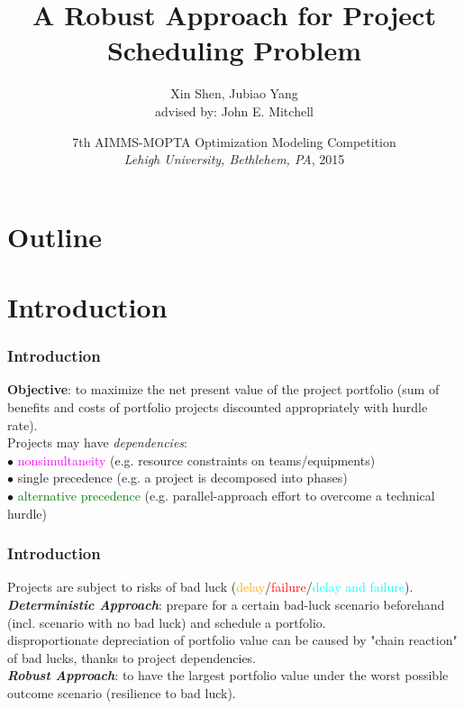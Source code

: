 \documentclass{beamer}
\title[Robust Scheduling]{A Robust Approach for Project Scheduling Problem}
\author[Shen, Yang]{Xin Shen, Jubiao Yang\\{\small advised by: John E. Mitchell}}
\institute[RPI]{ 
Rensselaer Polytechnic Institute  \\
Troy,  NY  12180}
\date[MOPTA 2015]{7th AIMMS-MOPTA Optimization Modeling Competition\\\textit{Lehigh University, Bethlehem, PA}, 2015}
\newcommand{\torange}{\textcolor{orange}}
\newcommand{\tred}{\textcolor{red}}
\newcommand{\tmag}{\textcolor{magenta}}
\newcommand{\tgreen}{\textcolor{green}}
\newcommand{\tcyan}{\textcolor{cyan}}
\newcommand{\tcam}{\textcolor{blue!40}}
\begin{document}
	

	\begin{frame}
		\titlepage
	\end{frame}

	\section*{Outline} 
		\begin{frame}[allowframebreaks]
			\tableofcontents 
		\end{frame}

	\section{Introduction}
		\begin{frame}
			\frametitle{Introduction}
			\textbf{Objective}: to maximize the net present value of the project portfolio (sum of benefits and costs of portfolio projects discounted appropriately with hurdle rate).\\
			\bigskip
			Projects may have \textit{dependencies}:\\
			\smallskip
			$\bullet$ \tmag{nonsimultaneity} (e.g. resource constraints on teams/equipments)\\
			\smallskip
			$\bullet$ \tcam{single precedence} (e.g. a project is decomposed into phases)\\
			\smallskip
			$\bullet$ \tgreen{alternative precedence} (e.g. parallel-approach effort to overcome a technical hurdle)
		\end{frame}
		
		\begin{frame}
			\frametitle{Introduction}
			Projects are subject to risks of bad luck (\torange{delay}/\tred{failure}/\tcyan{delay and failure}).\\
			\bigskip
			\textbf{\textit{Deterministic Approach}}: prepare for a certain bad-luck scenario beforehand (incl. scenario with no bad luck) and schedule a portfolio.\\
			\smallskip
			disproportionate depreciation of portfolio value can be caused by "chain reaction" of bad lucks, thanks to project dependencies.\\
			\bigskip
			\textbf{\textit{Robust Approach}}: to have the largest portfolio value under the worst possible outcome scenario (resilience to bad luck).
		\end{frame}
\end{document}
